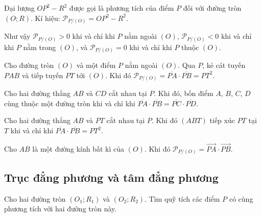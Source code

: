 \documentclass{article} %
\begin{document}
        \begin{definition}
            Đại lượng \(OP^2 - R^2\) được gọi là phương tích của điểm \(P\) đối với đường tròn \((O;R)\). Kí hiệu: \(\mathcal{P}_{P/(O)} = OP^2 - R^2\).
        \end{definition}
        Như vậy \(\mathcal{P}_{P/(O)} > 0\) khi và chỉ khi \(P\) nằm ngoài \((O)\), \(\mathcal{P}_{P/(O)} < 0\) khi và chỉ khi \(P\) nằm trong \((O)\), và \(\mathcal{P}_{P/(O)} = 0\) khi và chỉ khi \(P\) thuộc \((O)\).

        \begin{property}
            Cho đường tròn \((O)\) và một điểm \(P\) nằm ngoài \((O)\). Qua \(P\), kẻ cát tuyến \(PAB\) và tiếp tuyến \(PT\) tới \((O)\). Khi đó \(\mathcal{P}_{P/(O)} = \overline{PA} \cdot \overline{PB} = PT^2\).
        \end{property}

        \begin{property}
            Cho hai đường thẳng \(AB\) và \(CD\) cắt nhau tại \(P\). Khi đó, bốn điểm \(A\), \(B\), \(C\), \(D\) cùng thuộc một đường tròn khi và chỉ khi \(\overline{PA} \cdot \overline{PB} = \overline{PC} \cdot \overline{PD}\).
        \end{property}

        \begin{property}
            Cho hai đường thẳng \(AB\) và \(PT\) cắt nhau tại \(P\). Khi đó \((ABT)\) tiếp xúc \(PT\) tại \(T\) khi và chỉ khi \(\overline{PA} \cdot \overline{PB} = PT^2\).
        \end{property}

        \begin{property}
            Cho \(AB\) là một đường kính bất kì của \((O)\). Khi đó \(\mathcal{P}_{P/(O)} = \overrightarrow{PA} \cdot \overrightarrow{PB}\).
        \end{property}

    \subsection{Trục đẳng phương và tâm đẳng phương}

        \begin{problem}
            Cho hai đường tròn \((O_1;R_1)\) và \((O_2;R_2)\). Tìm quỹ tích các điểm \(P\) có cùng phương tích với hai đường tròn này.
        \end{problem}
    
\end{document}
